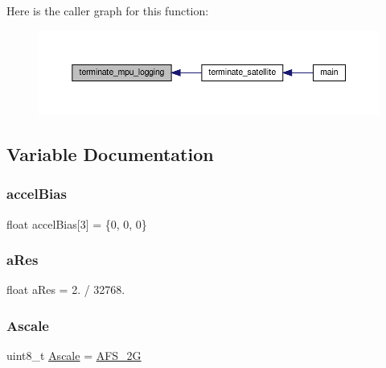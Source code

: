 Here is the caller graph for this function\+:
\nopagebreak
\begin{figure}[H]
\begin{center}
\leavevmode
\includegraphics[width=350pt]{i2c-interface_8c_a3644aefb56a2169f316b0f2510ffc56c_icgraph}
\end{center}
\end{figure}


\subsection{Variable Documentation}
\mbox{\label{i2c-interface_8c_ad9b8523cb349f7bbd3fa2ffa9c2c9d4b}} 
\subsubsection{\texorpdfstring{accel\+Bias}{accelBias}}
{\footnotesize\ttfamily float accel\+Bias\mbox{[}3\mbox{]} = \{0, 0, 0\}}

\mbox{\label{i2c-interface_8c_a00dcba4fbbc703a15404c051f397721f}} 
\subsubsection{\texorpdfstring{a\+Res}{aRes}}
{\footnotesize\ttfamily float a\+Res = 2. / 32768.}

\mbox{\label{i2c-interface_8c_a1b3bba16cabe134bc640926508ec94d3}} 
\subsubsection{\texorpdfstring{Ascale}{Ascale}}
{\footnotesize\ttfamily uint8\+\_\+t \hyperlink{i2c-interface_8c_a809d38a83bb0293b913cb890cafd82a8}{Ascale} = \hyperlink{i2c-interface_8c_a809d38a83bb0293b913cb890cafd82a8a93154da7a495cfb3b9ab29d2d5d4891b}{A\+F\+S\+\_\+2G}}

